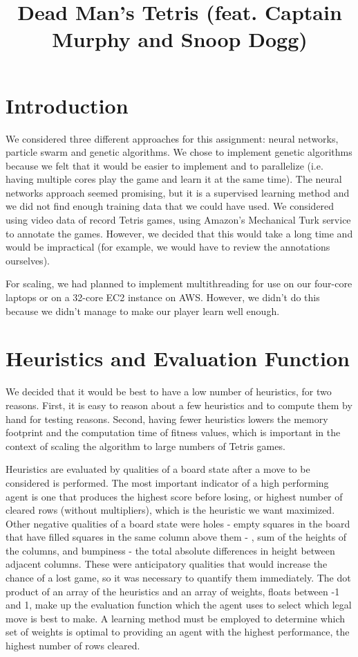 \documentclass[10pt]{report}
\title{Dead Man's Tetris (feat. Captain Murphy and Snoop Dogg)}
\begin{document}
\maketitle

\section{Introduction}
We considered three different approaches for this assignment: neural networks, particle swarm and genetic algorithms. We chose to implement genetic algorithms because we felt that it would be easier to implement and to parallelize (i.e. having multiple cores play the game and learn it at the same time). The neural networks approach seemed promising, but it is a supervised learning method and we did not find enough training data that we could have used. We considered using video data of record Tetris games, using Amazon’s Mechanical Turk service to annotate the games. However, we decided that this would take a long time and would be impractical (for example, we would have to review the annotations ourselves).

For scaling, we had planned to implement multithreading for use on our four-core laptops or on a 32-core EC2 instance on AWS. However, we didn’t do this because we didn’t manage to make our player learn well enough.

\section{Heuristics and Evaluation Function}
We decided that it would be best to have a low number of heuristics, for two reasons. First, it is easy to reason about a few heuristics and to compute them by hand for testing reasons. Second, having fewer heuristics lowers the memory footprint and the computation time of fitness values, which is important in the context of scaling the algorithm to large numbers of Tetris games.

Heuristics are evaluated by qualities of a board state after a move to be considered is performed. The most important indicator of a high performing agent is one that produces the highest score before losing, or highest number of cleared rows (without multipliers), which is the heuristic we want maximized. Other negative qualities of a board state were holes - empty squares in the board that have filled squares in the same column above them - , sum of the heights of the columns, and bumpiness - the total absolute differences in height between adjacent columns. These were anticipatory qualities that would increase the chance of a lost game, so it was necessary to quantify them immediately. The dot product of an array of the heuristics and an array of weights, floats between -1 and 1, make up the evaluation function which the agent uses to select which legal move is best to make. A learning method must be employed to determine which set of weights is optimal to providing an agent with the highest performance, the highest number of rows cleared.
\end{document}
